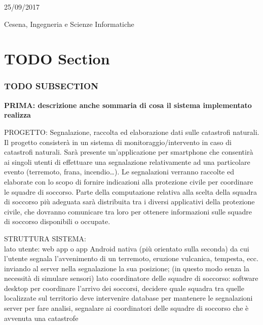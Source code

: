 \documentclass[10pt,english]{article}
\begin{document}
\begin{titlepage}
	\vspace{0.5\baselineskip} %
	
	
	\vfill %
	
	
	\vspace{0.3\baselineskip} %
	
	25/09/2017 %
	
	{\large Cesena, Ingegneria e Scienze Informatiche} %

\end{titlepage}

\section*{TODO Section}

\subsubsection*{TODO SUBSECTION}

\textbf{PRIMA: descrizione anche sommaria di cosa il sistema implementato realizza}

PROGETTO: Segnalazione, raccolta ed elaborazione dati sulle catastrofi naturali.\\

Il progetto consisterà in un sistema di monitoraggio/intervento in caso di catastrofi naturali. Sarà presente un’applicazione per smartphone che consentirà ai singoli utenti di effettuare una segnalazione relativamente ad una particolare evento (terremoto, frana, incendio…). Le segnalazioni verranno raccolte ed elaborate con lo scopo di fornire indicazioni alla protezione civile per coordinare le squadre di soccorso.
Parte della computazione relativa alla scelta della squadra di soccorso più adeguata sarà distribuita tra i diversi applicativi della protezione civile, che dovranno comunicare tra loro per ottenere informazioni sulle squadre di soccorso disponibili o occupate.


STRUTTURA SISTEMA:\\
lato utente: web app o app Android nativa (più orientato sulla seconda) da cui l’utente segnala l’avvenimento di un terremoto, eruzione vulcanica, tempesta, ecc. inviando al server nella segnalazione la sua posizione; (in questo modo senza la necessità di simulare sensori)
lato coordinatore delle squadre di soccorso: software desktop per coordinare l’arrivo dei soccorsi, decidere quale squadra tra quelle localizzate sul territorio deve intervenire
database per mantenere le segnalazioni
server per fare analisi, segnalare ai coordinatori delle squadre di soccorso che è avvenuta una catastrofe\\
\end{document}
